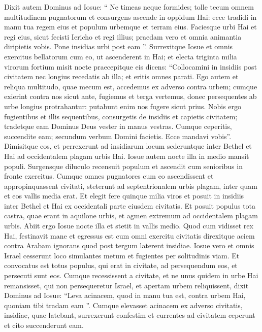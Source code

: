 \begin{biblechapter}
\begin{biblechapter}
\begin{biblechapter}
\begin{biblechapter}
\begin{biblechapter}
\begin{biblechapter}
\begin{biblechapter}
\begin{biblechapter}
\verse Dixit autem Dominus ad Iosue: “ Ne timeas neque formides; tolle tecum omnem multitudinem pugnatorum et consurgens ascende in oppidum Hai: ecce tradidi in manu tua regem eius et populum urbemque et terram eius. 
\verse Faciesque urbi Hai et regi eius, sicut fecisti Iericho et regi illius; praedam vero et omnia animantia diripietis vobis. Pone insidias urbi post eam ”.
 \verse Surrexitque Iosue et omnis exercitus bellatorum cum eo, ut ascenderent in Hai; et electa triginta milia virorum fortium misit nocte 
\verse praecepitque eis dicens: “Collocamini in insidiis post civitatem nec longius recedatis ab illa; et eritis omnes parati. 
\verse Ego autem et reliqua multitudo, quae mecum est, accedemus ex adverso contra urbem; cumque exierint contra nos sicut ante, fugiemus et terga vertemus, 
\verse donec persequentes ab urbe longius protrahantur: putabunt enim nos fugere sicut prius. 
\verse Nobis ergo fugientibus et illis sequentibus, consurgetis de insidiis et capietis civitatem; tradetque eam Dominus Deus vester in manus vestras. 
\verse Cumque ceperitis, succendite eam; secundum verbum Domini facietis. Ecce mandavi vobis”. 
\verse Dimisitque eos, et perrexerunt ad insidiarum locum sederuntque inter Bethel et Hai ad occidentalem plagam urbis Hai. Iosue autem nocte illa in medio mansit populi.
 \verse Surgensque diluculo recensuit populum et ascendit cum senioribus in fronte exercitus. 
\verse Cumque omnes pugnatores cum eo ascendissent et appropinquassent civitati, steterunt ad septentrionalem urbis plagam, inter quam et eos vallis media erat. 
\verse Et elegit fere quinque milia viros et posuit in insidiis inter Bethel et Hai ex occidentali parte eiusdem civitatis. 
\verse Et posuit populus tota castra, quae erant in aquilone urbis, et agmen extremum ad occidentalem plagam urbis. Abiit ergo Iosue nocte illa et stetit in vallis medio. 
\verse Quod cum vidisset rex Hai, festinavit mane et egressus est cum omni exercitu civitatis direxitque aciem contra Arabam ignorans quod post tergum laterent insidiae. 
\verse Iosue vero et omnis Israel cesserunt loco simulantes metum et fugientes per solitudinis viam. 
\verse Et convocatus est totus populus, qui erat in civitate, ad persequendum eos, et persecuti sunt eos. Cumque recessissent a civitate, 
\verse et ne unus quidem in urbe Hai remansisset, qui non persequeretur Israel, et apertam urbem reliquissent, 
\verse dixit Dominus ad Iosue: “Leva acinacem, quod in manu tua est, contra urbem Hai, quoniam tibi tradam eam ”.
 \verse Cumque elevasset acinacem ex adverso civitatis, insidiae, quae latebant, surrexerunt confestim et currentes ad civitatem ceperunt et cito succenderunt eam. 

\end{biblechapter}
\end{biblechapter}
\end{biblechapter}
\end{biblechapter}
\end{biblechapter}
\end{biblechapter}
\end{biblechapter}
\end{biblechapter}
